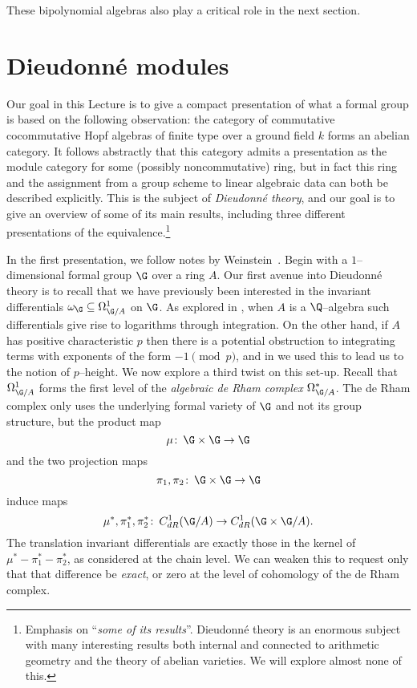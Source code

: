 These bipolynomial algebras also play a critical role in the next section.










\section{Dieudonn\'e modules}\label{SectionDieudonneModules}

Our goal in this Lecture is to give a compact presentation of what a formal group is based on the following observation: the category of commutative cocommutative Hopf algebras of finite type over a ground field $k$ forms an abelian category.  It follows abstractly that this category admits a presentation as the module category for some (possibly noncommutative) ring, but in fact this ring and the assignment from a group scheme to linear algebraic data can both be described explicitly.  This is the subject of \textit{Dieudonn\'e theory}, and our goal is to give an overview of some of its main results, including three different presentations of the equivalence.\footnote{Emphasis on ``\emph{some of its results}''.  Dieudonn\'e theory is an enormous subject with many interesting results both internal and connected to arithmetic geometry and the theory of abelian varieties.  We will explore almost none of this.}

In the first presentation, we follow notes by Weinstein~\cite[Lecture 1]{Weinstein}.  Begin with a $1$--dimensional formal group $\G$ over a ring $A$.  Our first avenue into Dieudonn\'e theory is to recall that we have previously been interested in the invariant differentials $\omega_{\G} \subseteq \Omega^1_{\G/A}$ on $\G$.  As explored in , when $A$ is a $\Q$--algebra such differentials give rise to logarithms through integration.  On the other hand, if $A$ has positive characteristic $p$ then there is a potential obstruction to integrating terms with exponents of the form $-1 \pmod p$, and in  we used this to lead us to the notion of $p$--height.  We now explore a third twist on this set-up.  Recall that $\Omega^1_{\G/A}$ forms the first level of the \textit{algebraic de Rham complex} $\Omega^*_{\G/A}$.  The de Rham complex only uses the underlying formal variety of $\G$ and not its group structure, but the product map \[\mu\co \G \times \G \to \G\] and the two projection maps \[\pi_1, \pi_2\co \G \times \G \to \G\] induce maps \[\mu^*, \pi_1^*, \pi_2^*\co C_{dR}^1(\G/A) \to C_{dR}^1(\G \times \G / A).\]  The translation invariant differentials are exactly those in the kernel of $\mu^* - \pi_1^* - \pi_2^*$, as considered at the chain level.  We can weaken this to request only that that difference be \emph{exact}, or zero at the level of cohomology of the de Rham complex.

